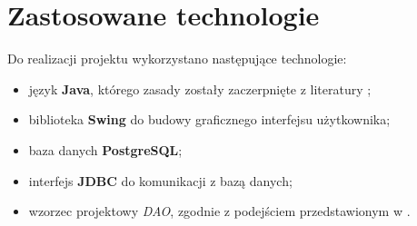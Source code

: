 \section{Zastosowane technologie}

Do realizacji projektu wykorzystano następujące technologie:

\begin{itemize}
    \item język \textbf{Java}, którego zasady zostały zaczerpnięte z literatury \cite{horstmann};
    \item biblioteka \textbf{Swing} do budowy graficznego interfejsu użytkownika;
    \item baza danych \textbf{PostgreSQL};
    \item interfejs \textbf{JDBC} do komunikacji z bazą danych;
    \item wzorzec projektowy \textit{DAO}, zgodnie z podejściem przedstawionym w \cite{dao}.
\end{itemize}
